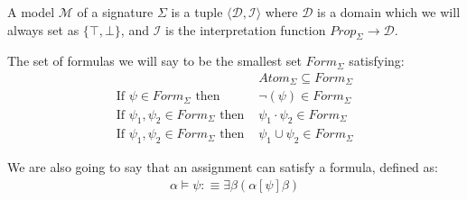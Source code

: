 \documentclass[12pt]{article}
\begin{document}
A model $\mathcal{M}$ of a signature $\Sigma$ is a tuple $\langle\mathcal{D},\mathcal{I}\rangle$ where $\mathcal{D}$ is a domain which we will always set as $\{\top,\bot\}$, and $\mathcal{I}$ is the interpretation function $Prop_\Sigma\to\mathcal{D}$.

The set of formulas we will say to be the smallest set $Form_\Sigma$ satisfying:
\begin{align}
&Atom_\Sigma \subseteq Form_\Sigma\\
\text{If } \psi\in Form_\Sigma \text{ then } &\neg(\psi)\in Form_\Sigma\\
\text{If } \psi_1,\psi_2\in Form_\Sigma \text{ then } &\psi_1\cdot\psi_2\in Form_\Sigma\\
\text{If } \psi_1,\psi_2\in Form_\Sigma \text{ then } &\psi_1\cup\psi_2\in Form_\Sigma
\end{align}

We are also going to say that an assignment can satisfy a formula, defined as:
\begin{align}
\alpha\models\psi :\equiv \exists\beta(\alpha[\psi]\beta)
\end{align}
\end{document}
